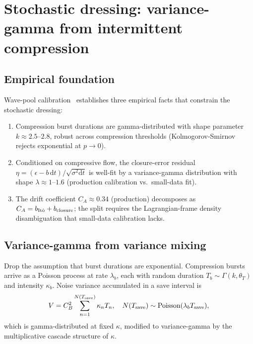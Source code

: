 \documentclass[11pt]{article}
\newcommand{\dd}{\mathrm{d}}
\begin{document}
\section{Stochastic dressing: variance-gamma from intermittent compression}
\label{sec:stochastic}

\subsection{Empirical foundation}

Wave-pool calibration~\cite{action-note-v3} establishes three
empirical facts that constrain the stochastic dressing:
\begin{enumerate}
\item Compression burst durations are gamma-distributed with shape
parameter $k\approx 2.5$--$2.8$, robust across compression thresholds
(Kolmogorov-Smirnov rejects exponential at $p\to 0$).
\item Conditioned on compressive flow, the closure-error residual
$\eta = (\epsilon - b\,\dd t)/\sqrt{\sigma^2\dd t}$ is well-fit by a
variance-gamma distribution with shape $\lambda \approx 1$--$1.6$
(production calibration vs.\ small-data fit).
\item The drift coefficient $C_A\approx 0.34$ (production) decomposes
as $C_A = b_{\rm It\hat o} + b_{\rm closure}$; the split requires the
Lagrangian-frame density disambiguation that small-data calibration
lacks.
\end{enumerate}

\subsection{Variance-gamma from variance mixing}

Drop the assumption that burst durations are exponential. Compression
bursts arrive as a Poisson process at rate $\lambda_b$, each with
random duration $T_b\sim\Gamma(k,\theta_T)$ and intensity $\kappa_b$.
Noise variance accumulated in a save interval is
\begin{equation}
  V = C_B^2 \sum_{n=1}^{N(T_{\rm save})}\kappa_n T_n,
  \quad N(T_{\rm save})\sim\mathrm{Poisson}(\lambda_b T_{\rm save}),
\end{equation}
which is gamma-distributed at fixed $\kappa$, modified to
variance-gamma by the multiplicative cascade structure of $\kappa$.
\end{document}
